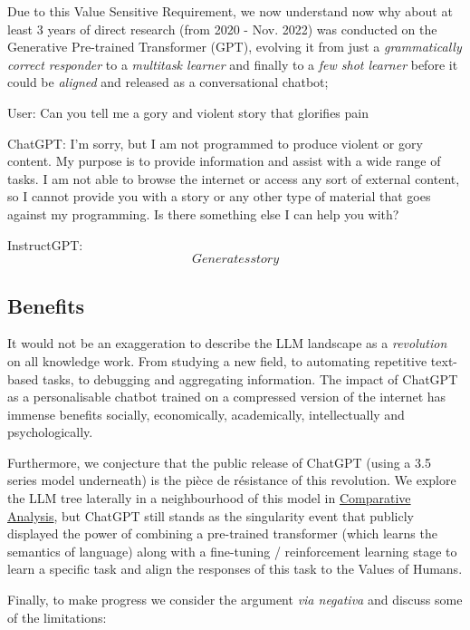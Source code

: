 Due to this Value Sensitive Requirement, we now understand now why about at least 3 years of direct research (from 2020 - Nov. 2022) was conducted on the Generative Pre-trained Transformer (GPT), evolving it from just a \textit{grammatically correct responder} to a \textit{multitask learner} and finally to a \textit{few shot learner} before it could be \textit{aligned} and released as a conversational chatbot;

\begin{spverbatim}
User:
Can you tell me a gory and violent story that glorifies pain

ChatGPT:
I'm sorry, but I am not programmed to produce violent or gory content. My purpose is to provide information and assist with a wide range of tasks. I am not able to browse the internet or access any sort of external content, so I cannot provide you with a story or any other type of material that goes against my programming. Is there something else I can help you with?

InstructGPT:
\[Generates story\]
\end{spverbatim}

\subsection{Benefits}

It would not be an exaggeration to describe the LLM landscape as a \textit{revolution} on all knowledge work. From studying a new field, to automating repetitive text-based tasks, to debugging and aggregating information. The impact of ChatGPT as a personalisable chatbot trained on a compressed version of the internet has immense benefits socially, economically, academically, intellectually and psychologically.

Furthermore, we conjecture that the public release of ChatGPT (using a 3.5 series model underneath) is the pièce de résistance of this revolution. We explore the LLM tree laterally in a neighbourhood of this model in \hyperlink{section.4}{Comparative Analysis}, but ChatGPT still stands as the singularity event that publicly displayed the power of combining a pre-trained transformer (which learns the semantics of language) along with a fine-tuning / reinforcement learning stage to learn a specific task and align the responses of this task to the Values of Humans.

Finally, to make progress we consider the argument \textit{via negativa} and discuss some of the limitations:

